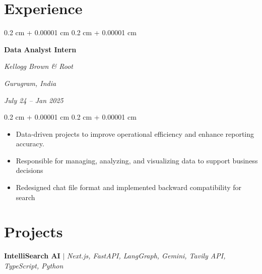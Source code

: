 \documentclass[10pt, letterpaper]{article}
\newenvironment{highlights}{
    \begin{itemize}[
        topsep=0.10 cm,
        parsep=0.10 cm,
        partopsep=0pt,
        itemsep=0pt,
        leftmargin=0.4 cm + 10pt
    ]
}{
    \end{itemize}
} %
\newenvironment{onecolentry}{
    \begin{adjustwidth}{
        0.2 cm + 0.00001 cm
    }{
        0.2 cm + 0.00001 cm
    }
}{
    \end{adjustwidth}
} %
\newenvironment{twocolentry}[2][]{
    \onecolentry
    \def\secondColumn{#2}
    \setcolumnwidth{\fill, 4.5 cm}
    \begin{paracol}{2}
}{
    \switchcolumn \raggedleft \secondColumn
    \end{paracol}
    \endonecolentry
} %
\begin{document}
  \vspace{0.3 cm - 0.3 cm}


    
    \section{Experience}



        
        \begin{twocolentry}{
        \textit{Gurugram, India}    
            
        \textit{July 24 –  Jan 2025}}
            \textbf{Data Analyst Intern}
            
            \textit{Kellogg Brown \& Root}
        \end{twocolentry}

        \vspace{0.10 cm}
        \begin{onecolentry}
            \begin{highlights}
                \item Data-driven projects to improve operational efficiency and enhance reporting accuracy. 
                \item Responsible for managing, analyzing, and visualizing data to support business decisions 
                \item Redesigned chat file format and implemented backward compatibility for search
            \end{highlights}
        \end{onecolentry}








    
    \section{Projects}



        

        
   \vspace{0.3cm}
\textbf{IntelliSearch AI} $|$ \emph{Next.js, FastAPI, LangGraph, Gemini, Tavily API, TypeScript, Python}
\end{document}
